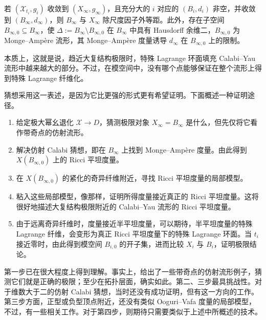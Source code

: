 \begin{conjecture}\label{conj:7.33}
若 $(\mathcal X_{t_i},g_i)$ 收敛到 $(X_\infty,g_\infty)$，且充分大的 $i$ 对应的 $(B_i,d_i)$ 非空，并收敛到 $(B_\infty,d_\infty)$，则 $B_\infty$ 与 $X_\infty$ 除尺度因子外等距。此外，存在子空间 $B_{\infty,0}\subseteq B_\infty$，使 $\Delta:=B_\infty\setminus B_{\infty,0}$ 在 $B_\infty$ 中具有 Hausdorff 余维二，$B_{\infty,0}$ 为 Monge--Ampère 流形，其 Monge--Ampère 度量诱导 $d_\infty$ 在 $B_{\infty,0}$ 上的限制。
\end{conjecture}

本质上，这就是说，趋近大复结构极限时，特殊 Lagrange 环面填充 Calabi--Yau 流形中越来越大的部分。不过，在模空间中，没有哪个点能够保证在整个流形上得到特殊 Lagrange 纤维化。

猜想采用这一表述，是因为它比更强的形式更有希望证明。下面概述一种证明途径。
\begin{enumerate}
\item 给定极大幂幺退化 $\mathcal X\to D$，猜测极限对象 $X_\infty=B_\infty$ 是什么，但先仅将它看作带奇点的仿射流形。
\item 解决仿射 Calabi 猜想，即在 $B_\infty$ 上找到 Monge--Ampère 度量。由此得到 $X(B_{\infty,0})$ 上的 Ricci 平坦度量。
\item 在 $X(B_{\infty,0})$ 的紧化的奇异纤维附近，寻找 Ricci 平坦度量的局部模型。
\item 粘入这些局部模型，像那样，证明所得度量接近真正的 Ricci 平坦度量。这将很好地描述大复结构极限附近的 Calabi--Yau 流形的 Ricci 平坦度量。
\item 由于远离奇异纤维时，度量接近半平坦度量，可以期待，半平坦度量的特殊 Lagrange 纤维，会变形为真正 Ricci 平坦度量下的特殊 Lagrange 环面。当 $t_i$ 接近零时，由此得到模空间 $B_{i,0}$ 的开子集，进而比较 $X_i$ 与 $B_i$，证明极限结论。
\end{enumerate}

第一步已在很大程度上得到理解。事实上，给出了一些带奇点的仿射流形例子，猜测它们就是正确的极限；至少在拓扑层面，确实如此。第二、三步最具挑战性。对于维数大于二的仿射 Calabi 猜想，当时还没有成功证明，但有这一方向的工作。第三步方面，正型或负型顶点附近，还没有类似 Ooguri--Vafa 度量的局部模型，不过，有一些相关工作。对于第四步，则期待只需要类似于上述中所概述的技术。

